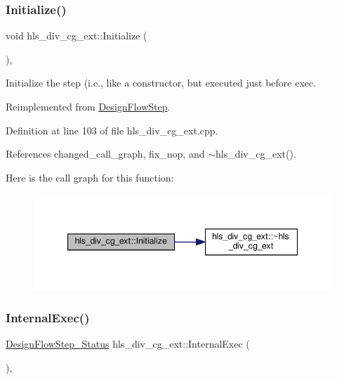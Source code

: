 \subsubsection{\texorpdfstring{Initialize()}{Initialize()}}
{\footnotesize\ttfamily void hls\+\_\+div\+\_\+cg\+\_\+ext\+::\+Initialize (\begin{DoxyParamCaption}{ }\end{DoxyParamCaption})\hspace{0.3cm}{\ttfamily [override]}, {\ttfamily [virtual]}}



Initialize the step (i.\+e., like a constructor, but executed just before exec. 



Reimplemented from \hyperlink{classDesignFlowStep_a44b50683382a094976e1d432a7784799}{Design\+Flow\+Step}.



Definition at line 103 of file hls\+\_\+div\+\_\+cg\+\_\+ext.\+cpp.



References changed\+\_\+call\+\_\+graph, fix\+\_\+nop, and $\sim$hls\+\_\+div\+\_\+cg\+\_\+ext().

Here is the call graph for this function\+:
\nopagebreak
\begin{figure}[H]
\begin{center}
\leavevmode
\includegraphics[width=347pt]{de/d52/classhls__div__cg__ext_a68ca8c0cd178e82f30fd07b8e471604d_cgraph}
\end{center}
\end{figure}
\mbox{\label{classhls__div__cg__ext_ad7e670a6ce48646651b6fe689e3d85d4}} 
\subsubsection{\texorpdfstring{Internal\+Exec()}{InternalExec()}}
{\footnotesize\ttfamily \hyperlink{design__flow__step_8hpp_afb1f0d73069c26076b8d31dbc8ebecdf}{Design\+Flow\+Step\+\_\+\+Status} hls\+\_\+div\+\_\+cg\+\_\+ext\+::\+Internal\+Exec (\begin{DoxyParamCaption}{ }\end{DoxyParamCaption})\hspace{0.3cm}{\ttfamily [override]}, {\ttfamily [virtual]}}



